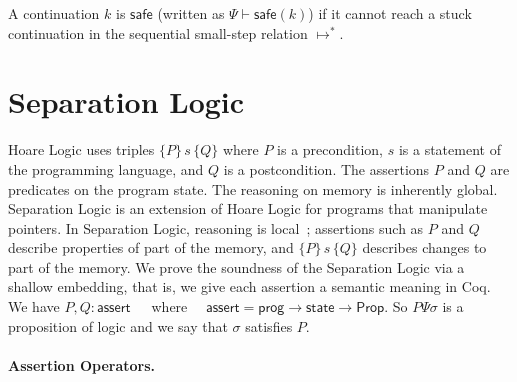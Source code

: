 \documentclass{llncs}
\newcommand{\tyface}[1]{\ensuremath{\mathsf{#1}}}
\newcommand{\fmap}{\Psi}
\begin{document}
\begin{definition}\label{def:safe}
A continuation $k$ is \tyface{safe} (written as $\fmap\vdash\tyface{safe}(k)$\label{lab:safe}) if
it cannot reach a stuck continuation
in the sequential small-step relation $\longmapsto^{*}$.
\end{definition}

\section{Separation Logic}
\label{seplog}

Hoare Logic uses triples $\{P\}\,s\,\{Q\}$ where
$P$ is a precondition, $s$ is a statement of the programming
language, and $Q$ is a postcondition. The assertions $P$ and $Q$ are
predicates on the program state. 
The reasoning on memory is inherently global.
Separation Logic is an extension of Hoare Logic for programs that manipulate pointers.
In Separation Logic, reasoning is local~\cite{ohearn01};
assertions such as $P$ and $Q$ describe properties of part of the memory, 
and $\{P\}\,s\,\{Q\}$
describes changes to part of the memory.
We prove the soundness of the Separation Logic
via a shallow embedding, that is, we give
each assertion a semantic meaning in Coq.
We have
$P,Q: \tyface{assert}$~~~where~~ $\tyface{assert}=\tyface{prog}\rightarrow\tyface{state}\rightarrow\tyface{Prop}$.
So $P\fmap\sigma$ is a proposition of logic and we say that $\sigma$ satisfies $P$.

\paragraph{Assertion Operators.}
\end{document}

